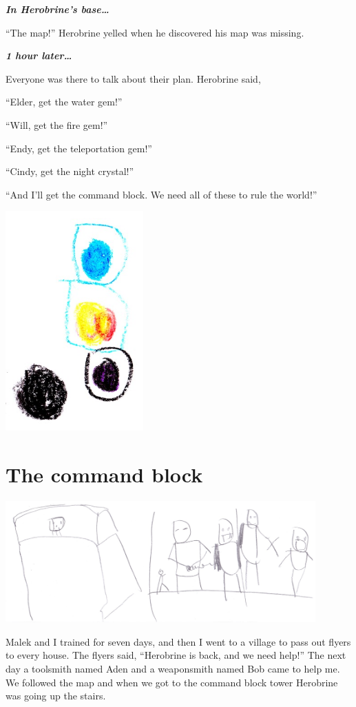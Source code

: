 \documentclass[12pt,oneside]{krantz}
\begin{document}
\textbf{\emph{In Herobrine's base\ldots{}}}

``The map!'' Herobrine yelled when he discovered his map was missing.

\textbf{\emph{1 hour later\ldots{}}}

Everyone was there to talk about their plan. Herobrine said,

``Elder, get the water gem!''

``Will, get the fire gem!''

``Endy, get the teleportation gem!''

``Cindy, get the night crystal!''

``And I'll get the command block. We need all of these to rule the
world!''

\includegraphics[width=2.08333in,height=\textheight]{img/final-war/crystals.jpg}

\hypertarget{the-command-block}{%
\chapter{The command block}\label{the-command-block}}

\includegraphics[width=4.6875in,height=\textheight]{img/final-war/nooooo.jpg}

Malek and I trained for seven days, and then I went to a village to pass
out flyers to every house. The flyers said, ``Herobrine is back, and we
need help!'' The next day a toolsmith named Aden and a weaponsmith named
Bob came to help me. We followed the map and when we got to the command
block tower Herobrine was going up the stairs.
\end{document}
